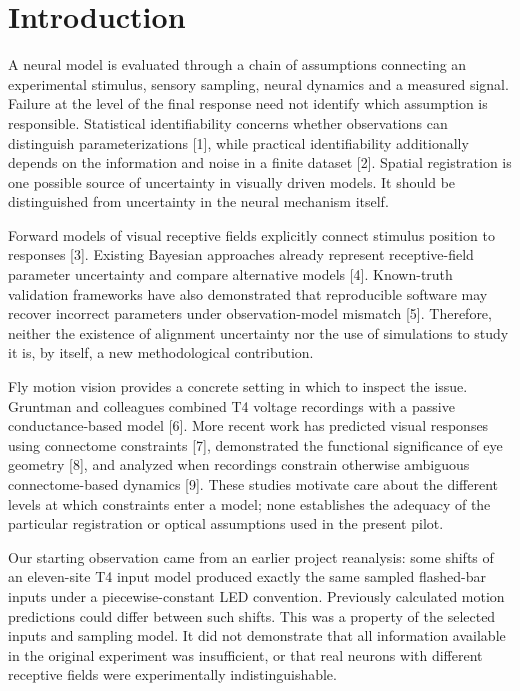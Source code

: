 \documentclass[11pt,letterpaper]{article}
\begin{document}
\section{Introduction}

A neural model is evaluated through a chain of assumptions connecting an experimental stimulus, sensory sampling, neural dynamics and a measured signal. Failure at the level of the final response need not identify which assumption is responsible. Statistical identifiability concerns whether observations can distinguish parameterizations [1], while practical identifiability additionally depends on the information and noise in a finite dataset [2]. Spatial registration is one possible source of uncertainty in visually driven models. It should be distinguished from uncertainty in the neural mechanism itself.


Forward models of visual receptive fields explicitly connect stimulus position to responses [3]. Existing Bayesian approaches already represent receptive-field parameter uncertainty and compare alternative models [4]. Known-truth validation frameworks have also demonstrated that reproducible software may recover incorrect parameters under observation-model mismatch [5]. Therefore, neither the existence of alignment uncertainty nor the use of simulations to study it is, by itself, a new methodological contribution.


Fly motion vision provides a concrete setting in which to inspect the issue. Gruntman and colleagues combined T4 voltage recordings with a passive conductance-based model [6]. More recent work has predicted visual responses using connectome constraints [7], demonstrated the functional significance of eye geometry [8], and analyzed when recordings constrain otherwise ambiguous connectome-based dynamics [9]. These studies motivate care about the different levels at which constraints enter a model; none establishes the adequacy of the particular registration or optical assumptions used in the present pilot.


Our starting observation came from an earlier project reanalysis: some shifts of an eleven-site T4 input model produced exactly the same sampled flashed-bar inputs under a piecewise-constant LED convention. Previously calculated motion predictions could differ between such shifts. This was a property of the selected inputs and sampling model. It did not demonstrate that all information available in the original experiment was insufficient, or that real neurons with different receptive fields were experimentally indistinguishable.
\end{document}
